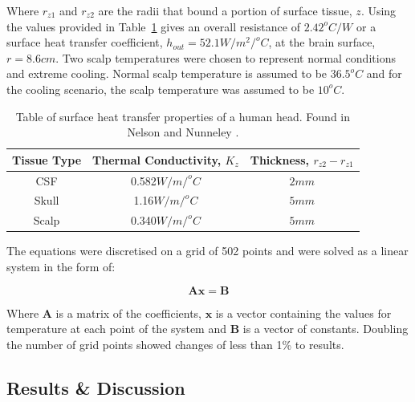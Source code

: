 \documentclass[11pt,english,a4paper,twoside,openright]{report}
\begin{document}
{{{{{{{{Where $r_{z1}$ and $r_{z2}$ are the radii that bound a portion of surface tissue, $z$. Using the values provided in Table~\ref{tab:heattransfercoeff} gives an overall resistance of $2.42^{o}C/W$ or a surface heat transfer coefficient, $h_{out}=52.1W/m^{2}/^{o}C$, at the brain surface, $r = 8.6cm$. Two scalp temperatures were chosen to represent normal conditions and extreme cooling. Normal scalp temperature is assumed to be $36.5^{o}C$ and for the cooling scenario, the scalp temperature was assumed to be $10^{o}C$.

\begin{table}
	\centering
	\fontsize{8pt}{9pt}\selectfont
	\begin{tabular}{c c c}
		\toprule
		\textbf{Tissue Type} & \textbf{Thermal Conductivity, $K_{z}$} & \textbf{Thickness, $r_{z2}-r_{z1}$} \\ \hline
		CSF & 0.582$W/m/^{o}C$ & $2mm$ \\ 
		Skull & 1.16$W/m/^{o}C$ & $5mm$ \\ 
		Scalp & 0.340$W/m/^{o}C$ & $5mm$ \\ \bottomrule
	\end{tabular}
	\caption[Surface heat transfer properties of a human head]{Table of surface heat transfer properties of a human head. Found in Nelson and Nunneley \cite{nelson1998brain}.}
	\label{tab:heattransfercoeff}
\end{table}

The equations were discretised on a grid of 502 points and were solved as a linear system in the form of:

\begin{equation}
\mathbf{A}\mathbf{x}=\mathbf{B}
\end{equation}

Where $\mathbf{A}$ is a matrix of the coefficients, $\mathbf{x}$ is a vector containing the values for temperature at each point of the system and $\mathbf{B}$ is a vector of constants. Doubling the number of grid points showed changes of less than 1\% to results.

\subsection{Results \& Discussion}
\label{Sec:21DHemisphereResults}

}}}}}}}}
\end{document}
